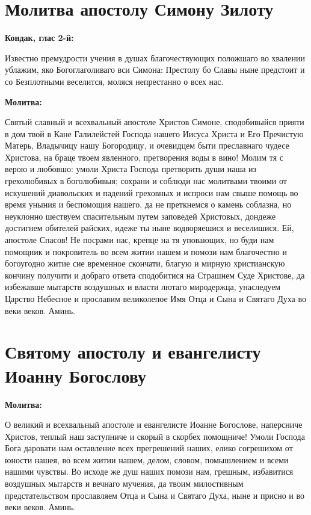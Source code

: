  



\section{Молитва апостолу Симону Зилоту}
 
\bfseries Кондак, глас 2-й:\normalfont{}


Известно премудрости учения в душах благочествующих положшаго во хвалении ублажим, яко Богоглаголиваго вси Симона: Престолу бо Славы ныне предстоит и со Безплотными веселится, моляся непрестанно о всех нас.


\medskip
\bfseries Молитва:\normalfont{}


Святый славный и всехвальный апостоле Христов Симоне, сподобивыйся прияти в дом твой в Кане Галилейстей Господа нашего Иисуса Христа и Его Пречистую Матерь, Владычицу нашу Богородицу, и очевидцем быти преславнаго чудесе Христова, на браце твоем явленного, претворения воды в вино! Молим тя с верою и любовшо: умоли Христа Господа претворить души наша из грехолюбивых в боголюбивыя; сохрани и соблюди нас молитвами твоими от искушений диавольских и падений греховных и испроси нам свыше помощь во время уныния и беспомощия нашего, да не преткнемся о камень соблазна, но неуклонно шествуем спасительным путем заповедей Христовых, дондеже достигнем обителей райских, идеже ты ныне водворяешися и веселишися. Ей, апостоле Спасов! Не посрами нас, крепце на тя уповающих, но буди нам помощник и покровитель во всем житии нашем и помози нам благочестно и богоугодно житие сие временное скончати, благую и мирную христианскую кончину получити и добраго ответа сподобитися на Страшнем Суде Христове, да избежавше мытарств воздушных и власти лютаго миродержца, унаследуем Царство Небесное и прославим великолепое Имя Отца и Сына и Святаго Духа во веки веков. Аминь.


 

\section{Святому апостолу и евангелисту Иоанну Богослову}
 
\bfseries Молитва:\normalfont{}


О великий и всехвальный апостоле и евангелисте Иоанне Богослове, наперсниче Христов, теплый наш заступниче и скорый в скорбех помощниче! Умоли Господа Бога даровати нам оставление всех прегрешений наших, елико согрешихом от юности нашея, во всем житии нашем, делом, словом, помышлением и всеми нашими чувствы. Во исходе же душ наших помози нам, грешным, избавитися воздушных мытарств и вечнаго мучения, да твоим милостивным предстательством прославляем Отца и Сына и Святаго Духа, ныне и присно и во веки веков. Аминь.

